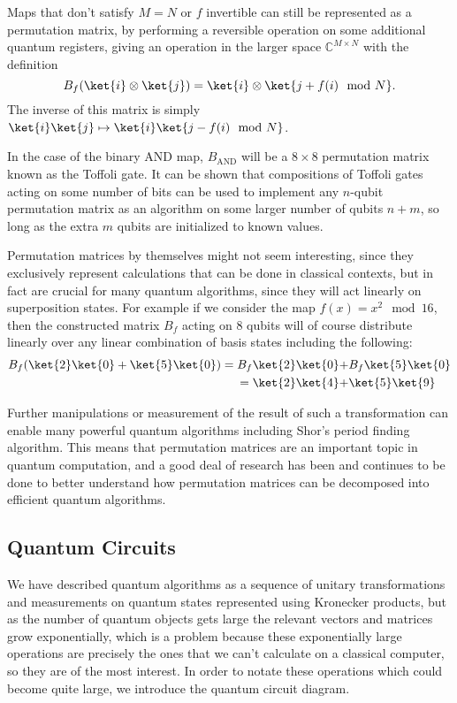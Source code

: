 Maps that don't satisfy $M = N$ or $f$ invertible can still be represented as a permutation matrix, by performing a reversible operation on some additional quantum registers, giving an operation in the larger space $\mathbb{C}^{M\times N}$ with the definition
\[B_f(\ket{i}\otimes\ket{j}) = \ket{i}\otimes\ket{j+f(i) \mod N}.\]
The inverse of this matrix is simply $\ket{i}\ket{j} \mapsto \ket{i}\ket{j-f(i) \mod N}$.

In the case of the binary AND map, $B_{\text{AND}}$ will be a $8\times8$ permutation matrix known as the Toffoli gate. It can be shown that compositions of Toffoli gates acting on some number of bits can be used to implement any $n$-qubit permutation matrix as an algorithm on some larger number of qubits $n+m$, so long as the extra $m$ qubits are initialized to known values.

Permutation matrices by themselves might not seem interesting, since they exclusively represent calculations that can be done in classical contexts, but in fact are crucial for many quantum algorithms, since they will act linearly on superposition states. For example if we consider the map $f(x) = x^2\mod 16$, then the constructed matrix $B_f$ acting on 8 qubits will of course distribute linearly over any linear combination of basis states including the following:
\begin{align*}
	B_f(\ket{2}\ket{0}+\ket{5}\ket{0}) 
	= B_f\ket{2}\ket{0} +& B_f\ket{5}\ket{0}
	\\= \ket{2}\ket{4} +& \ket{5}\ket{9}
\end{align*}

Further manipulations or measurement of the result of such a transformation can enable many powerful quantum algorithms including Shor's period finding algorithm. This means that permutation matrices are an important topic in quantum computation, and a good deal of research has been and continues to be done to better understand how permutation matrices can be decomposed into efficient quantum algorithms.

\subsection{Quantum Circuits}
We have described quantum algorithms as a sequence of unitary transformations and measurements on quantum states represented using Kronecker products, but as the number of quantum objects gets large the relevant vectors and matrices grow exponentially, which is a problem because these exponentially large operations are precisely the ones that we can't calculate on a classical computer, so they are of the most interest. In order to notate these operations which could become quite large, we introduce the quantum circuit diagram.

